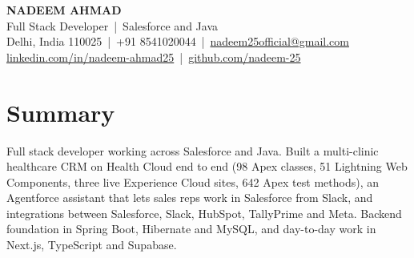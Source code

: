 \documentclass[10pt,a4paper]{article}
\begin{document}
\begin{center}
  {\fontsize{24}{28}\selectfont\bfseries NADEEM AHMAD}\\[3pt]
  {\large Full Stack Developer \,|\, Salesforce and Java}\\[4pt]
  {\small Delhi, India 110025 \,|\, +91 8541020044 \,|\,
  \href{mailto:nadeem25official@gmail.com}{\textcolor{accent}{nadeem25official@gmail.com}}\\[1pt]
  \href{https://www.linkedin.com/in/nadeem-ahmad25/}{\textcolor{accent}{linkedin.com/in/nadeem-ahmad25}} \,|\,
  \href{https://github.com/nadeem-25}{\textcolor{accent}{github.com/nadeem-25}}}
\end{center}

\section{Summary}
Full stack developer working across Salesforce and Java. Built a multi-clinic healthcare CRM on
Health Cloud end to end (98 Apex classes, 51 Lightning Web Components, three live Experience Cloud
sites, 642 Apex test methods), an Agentforce assistant that lets sales reps work in Salesforce from
Slack, and integrations between Salesforce, Slack, HubSpot, TallyPrime and Meta. Backend foundation
in Spring Boot, Hibernate and MySQL, and day-to-day work in Next.js, TypeScript and Supabase.

\end{document}
